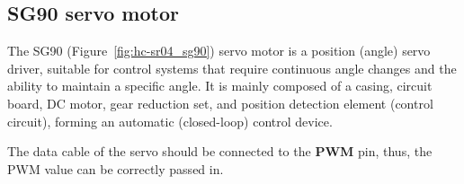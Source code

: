 \subsection{SG90 servo motor}

The SG90 (Figure~\ref{fig:hc-sr04_sg90}) servo motor is a position (angle) servo driver,
suitable for control systems that
require continuous angle changes and the ability to maintain a specific angle.
It is mainly composed of a casing, circuit board, DC motor, gear reduction set,
and position detection element (control circuit), forming an automatic (closed-loop) control device.

The data cable of the servo should be connected to the \textbf{PWM} pin, thus,
the PWM value can be correctly passed in.